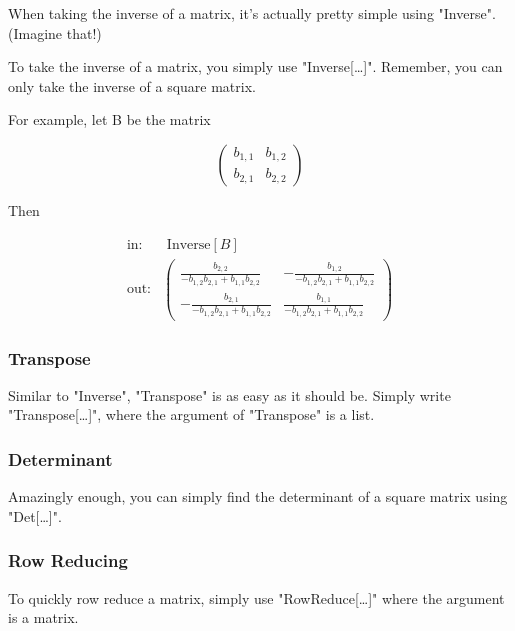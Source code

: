 \documentclass[11pt,a4paper,twoside]{article}
\begin{document}
							When taking the inverse of a matrix, it's actually pretty simple using "Inverse". (Imagine that!)
									
							To take the inverse of a matrix, you simply use "Inverse[\dots]".  Remember, you can only take the inverse of a square matrix.
									
							For example, let B be the matrix 
									
							\[ \left(
\begin{array}{cc}
 b_{1,1} & b_{1,2} \\
 b_{2,1} & b_{2,2}
\end{array}
\right) \]

							Then 
									
							\begin{align*}
										\text{in:}& \text{ Inverse}[B] \\
										\text{out:}& \left(
\begin{array}{cc}
 \frac{b_{2,2}}{-b_{1,2} b_{2,1}+b_{1,1} b_{2,2}} & -\frac{b_{1,2}}{-b_{1,2} b_{2,1}+b_{1,1} b_{2,2}} \\
 -\frac{b_{2,1}}{-b_{1,2} b_{2,1}+b_{1,1} b_{2,2}} & \frac{b_{1,1}}{-b_{1,2} b_{2,1}+b_{1,1} b_{2,2}}
\end{array}
\right)
							\end{align*}
									
				\subsubsection{Transpose}
								
					Similar to "Inverse", "Transpose" is as easy as it should be.  Simply write "Transpose[\dots]", where the argument of "Transpose" is a list.
								
				\subsubsection{Determinant}
								
					Amazingly enough, you can simply find the determinant of a square matrix using "Det[\dots]".
								
				\subsubsection{Row Reducing}
								
					To quickly row reduce a matrix, simply use  "RowReduce[\dots]" where the argument is a matrix.
							
\end{document}
